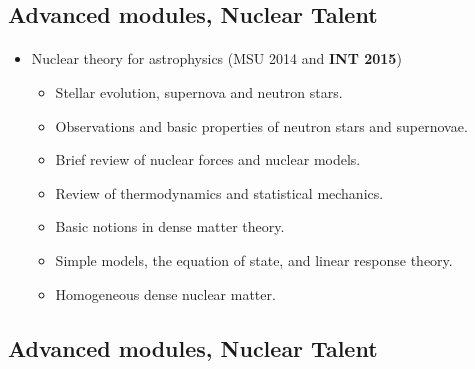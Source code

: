 \documentclass[%
twoside,                 %
final,                   %
10pt]{article}
\begin{document}
\noindent



\subsection*{Advanced  modules, Nuclear Talent}

\paragraph{}
\begin{itemize}
\item Nuclear theory for astrophysics (MSU 2014 and \textbf{INT 2015})
\begin{itemize}

  \item Stellar evolution, supernova and neutron stars.

  \item Observations and basic properties of neutron stars and supernovae.

  \item Brief review of nuclear forces and nuclear models.

  \item Review of thermodynamics and statistical mechanics.

  \item Basic notions in dense matter theory.

  \item Simple models, the equation of state, and linear response theory.

  \item Homogeneous dense nuclear matter.
\end{itemize}

\noindent
\end{itemize}

\noindent




\subsection*{Advanced  modules, Nuclear Talent}

\end{document}
